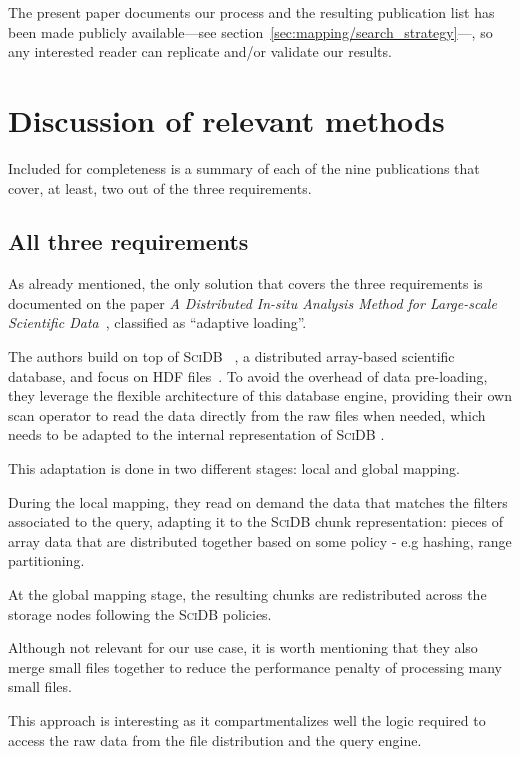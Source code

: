 The present paper documents our process and the resulting
publication list has been made publicly available---see
section~\ref{sec:mapping/search_strategy}---, so any interested reader can
replicate and/or validate our results.

\section{Discussion of relevant methods}
\label{sec:mapping/details}
Included for completeness is a summary of each of the nine publications 
that cover, at least, two out of the three requirements.

\subsection{All three requirements}
\newcommand{\scidb}[0]{\textsc{SciDB} }

As already mentioned, the only solution that covers the three requirements is
documented on the paper
\textit{A Distributed In-situ Analysis Method for Large-scale
Scientific Data}~\cite{Han2017}, classified as ``adaptive loading''.

The authors build on top of \scidb~\cite{Stonebraker2011}, a distributed
array-based scientific database, and focus on \textsc{HDF} files~\cite{HDF}.
To avoid the overhead of data pre-loading, they leverage the flexible
architecture of this database engine, providing their own scan operator to read
the data directly from the raw files when needed, which needs to be adapted
to the internal representation of \scidb.

This adaptation is done in two different stages: local and global mapping.

During the local mapping, they read on demand the data that matches the filters 
associated to the query, adapting it to the \scidb chunk representation: pieces 
of array data that are distributed together based on some policy - e.g hashing, 
range partitioning.

At the global mapping stage, the resulting chunks are redistributed across the 
storage nodes following the \scidb policies.

Although not relevant for our use case, it is worth mentioning that they also
merge small files together to reduce the performance penalty of processing many
small files.

This approach is interesting as it compartmentalizes well the logic
required to access the raw data from the file distribution and the query engine.

